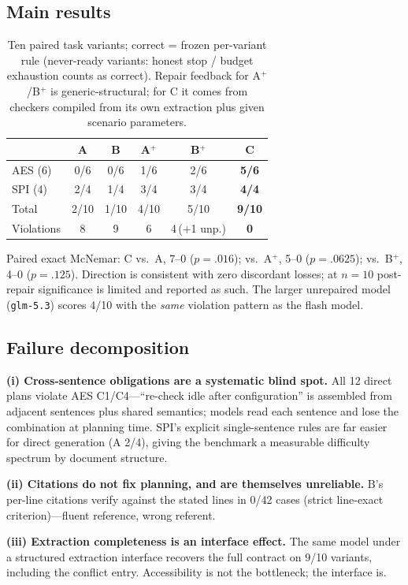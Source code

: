 \documentclass[conference]{IEEEtran}
\begin{document}
\subsection{Main results}
\begin{table}[t]
\centering
\caption{Ten paired task variants; correct = frozen per-variant rule
(never-ready variants: honest stop / budget exhaustion counts as
correct). Repair feedback for A$^+$/B$^+$ is generic-structural; for C
it comes from checkers compiled from its own extraction plus given
scenario parameters.}
\label{tab:main}
\begin{tabular}{lccccc}
\toprule
 & A & B & A$^+$ & B$^+$ & C \\
\midrule
AES (6) & 0/6 & 0/6 & 1/6 & 2/6 & \textbf{5/6} \\
SPI (4) & 2/4 & 1/4 & 3/4 & 3/4 & \textbf{4/4} \\
\midrule
Total & 2/10 & 1/10 & 4/10 & 5/10 & \textbf{9/10} \\
Violations & 8 & 9 & 6 & 4\,{\scriptsize(+1 unp.)} & \textbf{0} \\
\bottomrule
\end{tabular}
\end{table}
Paired exact McNemar: C vs.\ A, 7--0 ($p{=}.016$); vs.\ A$^+$, 5--0
($p{=}.0625$); vs.\ B$^+$, 4--0 ($p{=}.125$). Direction is consistent
with zero discordant losses; at $n{=}10$ post-repair significance is
limited and reported as such. The larger unrepaired model
(\texttt{glm-5.3}) scores 4/10 with the \emph{same} violation pattern
as the flash model.

\subsection{Failure decomposition}
\textbf{(i) Cross-sentence obligations are a systematic blind spot.}
All 12 direct plans violate AES C1/C4---``re-check idle after
configuration'' is assembled from adjacent sentences plus shared
semantics; models read each sentence and lose the combination at
planning time. SPI's explicit single-sentence rules are far easier for
direct generation (A 2/4), giving the benchmark a measurable difficulty
spectrum by document structure.

\textbf{(ii) Citations do not fix planning, and are themselves
unreliable.} B's per-line citations verify against the stated lines in
0/42 cases (strict line-exact criterion)---fluent reference, wrong
referent.

\textbf{(iii) Extraction completeness is an interface effect.} The same
model under a structured extraction interface recovers the full contract
on 9/10 variants, including the conflict entry. Accessibility is not
the bottleneck; the interface is.
\end{document}
